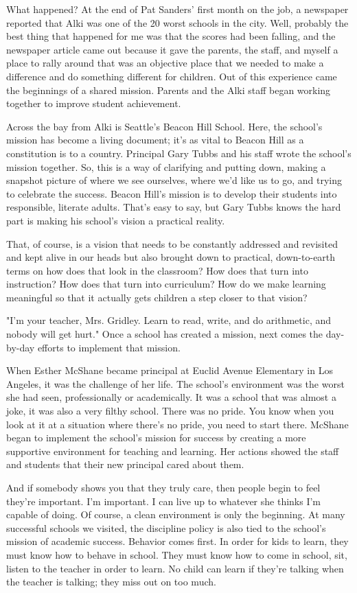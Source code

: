 What happened?
At the end of Pat Sanders' first month on the job, a newspaper reported that Alki was one of the 20 worst schools in the city.
Well, probably the best thing that happened for me was that the scores had been falling, and the newspaper article came out because it gave the parents, the staff, and myself a place to rally around that was an objective place that we needed to make a difference and do something different for children.
Out of this experience came the beginnings of a shared mission.
Parents and the Alki staff began working together to improve student achievement.

Across the bay from Alki is Seattle's Beacon Hill School.
Here, the school's mission has become a living document; it's as vital to Beacon Hill as a constitution is to a country.
Principal Gary Tubbs and his staff wrote the school's mission together.
So, this is a way of clarifying and putting down, making a snapshot picture of where we see ourselves, where we'd like us to go, and trying to celebrate the success.
Beacon Hill's mission is to develop their students into responsible, literate adults.
That's easy to say, but Gary Tubbs knows the hard part is making his school's vision a practical reality.

That, of course, is a vision that needs to be constantly addressed and revisited and kept alive in our heads but also brought down to practical, down-to-earth terms on how does that look in the classroom?
How does that turn into instruction?
How does that turn into curriculum?
How do we make learning meaningful so that it actually gets children a step closer to that vision?

"I'm your teacher, Mrs.
Gridley.
Learn to read, write, and do arithmetic, and nobody will get hurt." Once a school has created a mission, next comes the day-by-day efforts to implement that mission.

When Esther McShane became principal at Euclid Avenue Elementary in Los Angeles, it was the challenge of her life.
The school's environment was the worst she had seen, professionally or academically.
It was a school that was almost a joke, it was also a very filthy school.
There was no pride.
You know when you look at it at a situation where there's no pride, you need to start there.
McShane began to implement the school's mission for success by creating a more supportive environment for teaching and learning.
Her actions showed the staff and students that their new principal cared about them.

And if somebody shows you that they truly care, then people begin to feel they're important.
I'm important.
I can live up to whatever she thinks I'm capable of doing.
Of course, a clean environment is only the beginning.
At many successful schools we visited, the discipline policy is also tied to the school's mission of academic success.
Behavior comes first.
In order for kids to learn, they must know how to behave in school.
They must know how to come in school, sit, listen to the teacher in order to learn.
No child can learn if they're talking when the teacher is talking; they miss out on too much.

